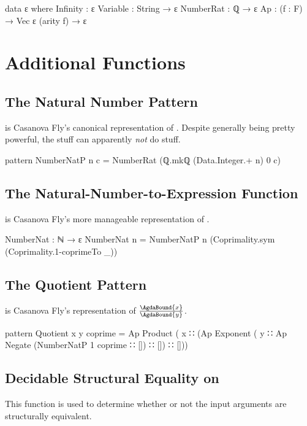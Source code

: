 \documentclass{report}
\begin{document}
\begin{code}
data ε where
  Infinity : ε
  Variable : String → ε
  NumberRat : ℚ → ε
  Ap : (f : F) → Vec ε (arity f) → ε
\end{code}

\section{Additional Functions}

\subsection{The Natural Number Pattern}
   is Casanova Fly's canonical representation of .  Despite generally being pretty powerful, the  stuff can apparently \emph{not} do  stuff.

\begin{code}
pattern NumberNatP n c = NumberRat (ℚ.mkℚ (Data.Integer.+ n) 0 c)
\end{code}

\subsection{The Natural-Number-to-Expression Function}
  is Casanova Fly's more manageable representation of .

\begin{code}
NumberNat : ℕ → ε
NumberNat n = NumberNatP n (Coprimality.sym (Coprimality.1-coprimeTo _))
\end{code}

\subsection{The Quotient Pattern}
    is Casanova Fly's representation of \(\frac{\AgdaBound{x}}{\AgdaBound{y}}\).

\begin{code}
pattern Quotient x y coprime =
  Ap Product
     ( x
     ∷ (Ap Exponent
           ( y
           ∷ Ap Negate (NumberNatP 1 coprime ∷ [])
           ∷ [])
     ∷ []))
\end{code}

\subsection{Decidable Structural Equality on }
This function is used to determine whether or not the input arguments are structurally equivalent.
\end{document}
